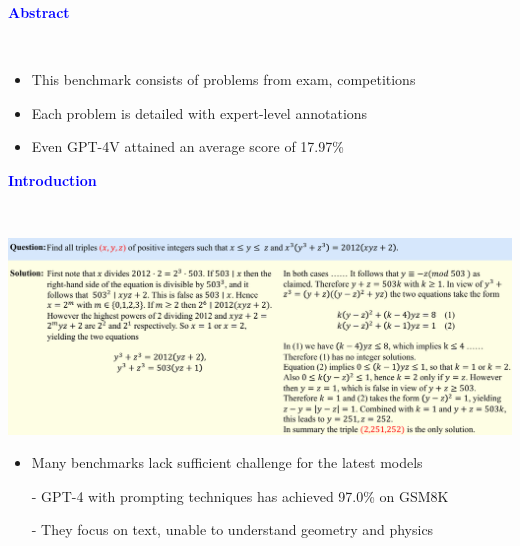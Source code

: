 \documentclass[professionalfont]{beamer}
\begin{document}
\frame{\titlepage}


\begin{frame}
\begin{center}
    { \textbf{\textcolor{blue}{ {\fontsize{12}{14}\selectfont Abstract} }} }
\end{center}
\\[0.5cm]

{\fontsize{10}{14}\selectfont 
\begin{itemize}
    \item This benchmark consists of problems from exam, competitions
    \item Each problem is detailed with expert-level annotations
    \item Even GPT-4V attained an average score of 17.97\%
\end{itemize}
}

\end{frame}

\begin{frame}
\begin{center}
    { \textbf{\textcolor{blue}{ {\fontsize{12}{14}\selectfont Introduction} }} }
\end{center}
\\[0.2cm]

\begin{center}
    \includegraphics[width=1.0\textwidth]{figure1.png}
\end{center}

{\fontsize{10}{14}\selectfont 
\begin{itemize}
    \item Many benchmarks lack sufficient challenge for the latest models
    
    - GPT-4 with prompting techniques has achieved 97.0\% on GSM8K
    
    - They focus on text, unable to understand geometry and physics
\end{itemize}
}

\end{frame}
\end{document}
